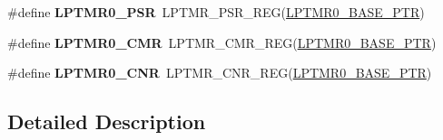 \begin{DoxyCompactItemize}
\#define {\bfseries L\+P\+T\+M\+R0\+\_\+\+P\+SR}~L\+P\+T\+M\+R\+\_\+\+P\+S\+R\+\_\+\+R\+EG(\hyperlink{group___l_p_t_m_r___peripheral_ga90a9194151ad11b422bcab162e797eda}{L\+P\+T\+M\+R0\+\_\+\+B\+A\+S\+E\+\_\+\+P\+TR})
\item 
\mbox{\label{group___l_p_t_m_r___register___accessor___macros_gac109508795b1b22820940313ddb4c620}} 
\#define {\bfseries L\+P\+T\+M\+R0\+\_\+\+C\+MR}~L\+P\+T\+M\+R\+\_\+\+C\+M\+R\+\_\+\+R\+EG(\hyperlink{group___l_p_t_m_r___peripheral_ga90a9194151ad11b422bcab162e797eda}{L\+P\+T\+M\+R0\+\_\+\+B\+A\+S\+E\+\_\+\+P\+TR})
\item 
\mbox{\label{group___l_p_t_m_r___register___accessor___macros_gada9bf6b3d564321571ac27faa4d263ad}} 
\#define {\bfseries L\+P\+T\+M\+R0\+\_\+\+C\+NR}~L\+P\+T\+M\+R\+\_\+\+C\+N\+R\+\_\+\+R\+EG(\hyperlink{group___l_p_t_m_r___peripheral_ga90a9194151ad11b422bcab162e797eda}{L\+P\+T\+M\+R0\+\_\+\+B\+A\+S\+E\+\_\+\+P\+TR})
\end{DoxyCompactItemize}


\subsection{Detailed Description}
